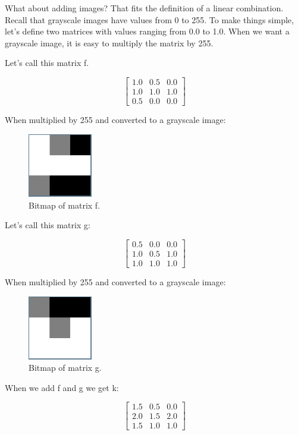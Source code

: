 What about adding images? That fits the definition of a linear combination. 
Recall that grayscale images have values from 0 to 255. To make things simple, 
let's define two matrices with values ranging from 0.0 to 1.0. When we want a 
grayscale image, it is easy to multiply the matrix by 255. 

Let's call this matrix f.

$$\begin{bmatrix}
1.0 & 0.5 & 0.0\\
1.0 & 1.0 & 1.0\\
0.5 & 0.0 & 0.0 
\end{bmatrix}$$

When multiplied by 255 and converted to a grayscale image:
\begin{figure}[htbp]
    \centering
    \includegraphics[width=0.25\textwidth]{fBitmap.png}
    \caption{Bitmap of matrix f.}
    \label{fig:fBitmap}
\end{figure}

Let's call this matrix g:

$$\begin{bmatrix}
0.5 & 0.0 & 0.0\\
1.0 & 0.5 & 1.0\\
1.0 & 1.0 & 1.0 
\end{bmatrix}$$

When multiplied by 255 and converted to a grayscale image:
\begin{figure}[htbp]
    \centering
    \includegraphics[width=0.25\textwidth]{gBitmap.png}
    \caption{Bitmap of matrix g.}
    \label{fig:gBitmap}
\end{figure}

When we add f and g we get k:

$$\begin{bmatrix}
1.5 & 0.5 & 0.0\\
2.0 & 1.5 & 2.0\\
1.5 & 1.0 & 1.0 
\end{bmatrix}$$

